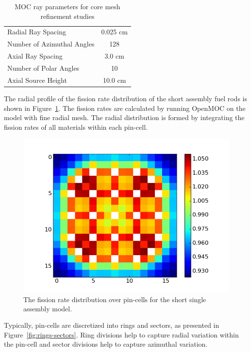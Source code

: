 \begin{table}[ht]
	\centering
	\caption{MOC ray parameters for core mesh refinement studies}
	\medskip
	\begin{tabular}{lc}
		\hline
		Radial Ray Spacing & 0.025 cm \\
		Number of Azimuthal Angles & 128 \\
		Axial Ray Spacing & 3.0 cm \\
		Number of Polar Angles & 10 \\
		Axial Source Height & 10.0 cm \\
		\hline
	\end{tabular}
	\label{tab:rad-mesh-refinement-params}
\end{table}

The radial profile of the fission rate distribution of the short assembly fuel rods is shown in Figure~\ref{fig:short-assembly-radial}. The fission rates are calculated by running OpenMOC on the model with fine radial mesh. The radial distribution is formed by integrating the fission rates of all materials within each pin-cell.

\begin{figure}[h!]
	\centering
	\includegraphics[width=0.7\linewidth]{figures/results/rr-plots/short-assembly-radial.png}
	\caption[]{The fission rate distribution over pin-cells for the short single assembly model.}
	\label{fig:short-assembly-radial}
\end{figure}

Typically, pin-cells are discretized into rings and sectors, as presented in Figure~\ref{fig:rings-sectors}. Ring divisions help to capture radial variation within the pin-cell and sector divisions help to capture azimuthal variation.

